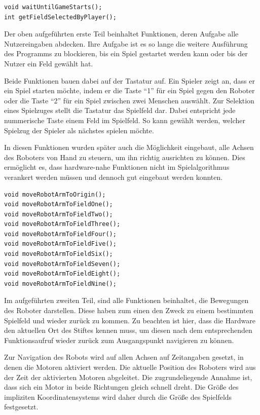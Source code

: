 \documentclass[conference,compsoc,final,a4paper]{IEEEtran}
\begin{document}
\begin{verbatim}
void waitUntilGameStarts();
int getFieldSelectedByPlayer();
\end{verbatim}

Der oben aufgeführten erste Teil beinhaltet Funktionen, deren Aufgabe alle Nutzereingaben abdecken.
Ihre Aufgabe ist es so lange die weitere Ausführung des Programms zu blockieren,
bis ein Spiel gestartet werden kann oder bis der Nutzer ein Feld gewählt hat.

Beide Funktionen bauen dabei auf der Tastatur auf. Ein Spieler zeigt an, dass er ein Spiel starten
möchte, indem er die Taste \enquote{1} für ein Spiel gegen den Roboter oder die Taste \enquote{2}
für ein Spiel zwischen zwei Menschen auswählt. Zur Selektion eines Spielzuges stellt die Tastatur
das Spielfeld dar. Dabei entspricht jede nummerische Taste einem Feld im Spielfeld. So kann
gewählt werden, welcher Spielzug der Spieler als nächstes spielen möchte.

In diesen Funktionen wurden später auch die Möglichkeit eingebaut, alle Achsen des Roboters von 
Hand zu steuern, um ihn richtig ausrichten zu können. Dies ermöglicht es, dass hardware-nahe Funktionen
nicht im Spielalgorithmus verankert werden müssen und dennoch gut eingebaut werden konnten.

\begin{verbatim}
void moveRobotArmToOrigin();
void moveRobotArmToFieldOne();
void moveRobotArmToFieldTwo();
void moveRobotArmToFieldThree();
void moveRobotArmToFieldFour();
void moveRobotArmToFieldFive();
void moveRobotArmToFieldSix();
void moveRobotArmToFieldSeven();
void moveRobotArmToFieldEight();
void moveRobotArmToFieldNine();
\end{verbatim}

Im aufgeführten zweiten Teil, sind alle Funktionen beinhaltet, die Bewegungen des Roboter darstellen. Diese haben
zum einen den Zweck zu einem bestimmten Spielfeld und wieder zurück zu kommen. Zu beachten ist hier,
dass die Hardware den aktuellen Ort des Stiftes kennen muss, um diesen nach dem entsprechenden Funktionsaufruf
wieder zurück zum Ausgangspunkt navigieren zu können.

Zur Navigation des Robots wird auf allen Achsen auf Zeitangaben gesetzt, in denen die Motoren aktiviert werden. Die
aktuelle Position des Roboters wird aus der Zeit der aktivierten Motoren abgeleitet. Die zugrundeliegende Annahme
ist, dass sich ein Motor in beide Richtungen gleich schnell dreht. Die Größe des impliziten Koordinatensystems wird
daher durch die Größe des Spielfelds festgesetzt.
\end{document}

